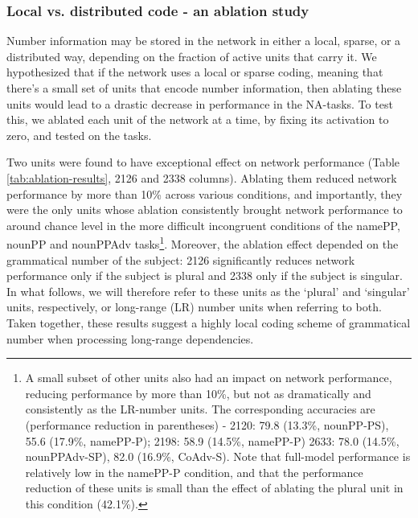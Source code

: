 \subsubsection{Local vs. distributed code - an ablation study}
Number information may be stored in the network in either a local,
sparse, or a distributed way, depending on the fraction of active
units that carry it.  We hypothesized that if the network uses a local
or sparse coding, meaning that there's a small set of units that
encode number information, then ablating these units would lead to a
drastic decrease in performance in the NA-tasks.  To test this, we
ablated each unit of the network at a time, by fixing its activation
to zero, and tested on the tasks.

Two units were found to have exceptional effect on network performance
(Table \ref{tab:ablation-results}, \unit{2}{126} and \unit{2}{338}
columns). Ablating them reduced network performance by more than 10\%
across various conditions, and importantly, they were the only units
whose ablation consistently brought network performance to around
chance level in the more difficult incongruent conditions of the
namePP, nounPP and nounPPAdv tasks\footnote{A small subset of other units
also had an impact on network performance, reducing performance by more than 10\%, but not as dramatically and consistently as the LR-number units. The corresponding accuracies are (performance reduction in parentheses) - \unit{2}{120}: 79.8 (13.3\%, nounPP-PS), 55.6 (17.9\%, namePP-P); \unit{2}{198}: 58.9 (14.5\%, namePP-P) \unit{2}{633}: 78.0 (14.5\%, nounPPAdv-SP), 82.0 (16.9\%, CoAdv-S). Note that full-model performance is relatively low in the namePP-P condition, and that the performance reduction of these units is small than the effect of ablating the plural unit in this condition (42.1\%).}. Moreover, the ablation effect depended on the grammatical number of the subject: \unit{2}{126} significantly reduces
network performance only if the subject is plural and \unit{2}{338}
only if the subject is singular. In what follows, we will therefore
refer to these units as the `plural' and `singular' units, respectively,
or long-range (LR) number units when referring to both. Taken
together, these results suggest a highly local coding scheme of
grammatical number when processing long-range dependencies.

